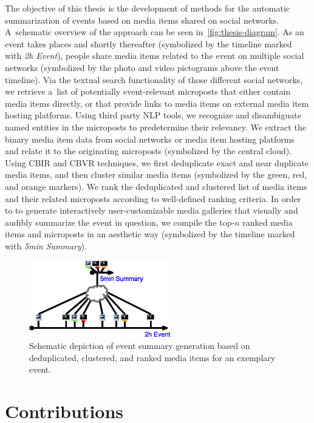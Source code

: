 The objective of this thesis is the development
of methods for the automatic summarization of events
based on media items shared on social networks.
A~schematic overview of the approach can be seen
in~\autoref{fig:thesis-diagram}.
As an event takes places and shortly thereafter
(symbolized by the timeline marked with \emph{2h Event}),
people share media items related to the event
on multiple social networks
(symbolized by the photo and video pictograms
above the event timeline).
Via the textual search functionality of those
different social networks,
we retrieve a~list of potentially event-relevant
microposts that either contain media items directly,
or that provide links to media items
on external media item hosting platforms.
Using third party NLP tools,
we recognize and disambiguate named entities
in the microposts to predetermine their relevancy.
We extract the binary media item data
from social networks or media item hosting platforms
and relate it to the originating microposts
(symbolized by the central cloud).
Using CBIR and CBVR techniques, we first deduplicate
exact and near duplicate media items,
and then cluster similar media items
(symbolized by the green, red, and orange markers).
We rank the deduplicated and clustered list
of media items and their related microposts
according to well-defined ranking criteria.
In order to to generate interactively user-customizable
media galleries that visually and audibly summarize the
event in question, we compile the top-$n$ ranked
media items and microposts in an aesthetic way
(symbolized by the timeline marked with \emph{5min Summary}).

\begin{figure}[h!]
  \centering
  \includegraphics[width=0.55\textwidth]{thesis-diagram.png}
  \caption{Schematic depiction of event summary generation
    based on deduplicated, clustered, and ranked media items
    for an exemplary event.}
  \label{fig:thesis-diagram}
\end{figure}

\section{Contributions}

